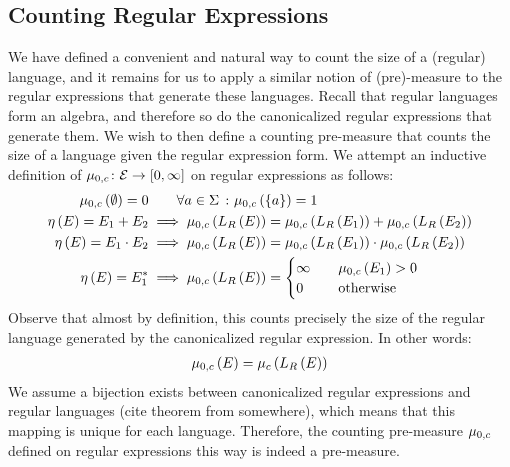 \subsection{Counting Regular Expressions}
We have defined a convenient and natural way to count the size of a
(regular) language, and it remains for us to apply a similar
notion of (pre)-measure to the regular expressions that generate
these languages.
Recall that regular languages form an algebra, and therefore so do
the canonicalized regular expressions that generate them.
We wish to then define a counting pre-measure that counts the size
of a language given the regular expression form.
We attempt an inductive definition of
\(\mu_{0, c} \colon \mathcal{E} \rightarrow \left[0, \infty\right]\)
on regular expressions as follows:
\begin{align*}
  \mu_{0, c}\left(\emptyset\right) = 0
    &\qquad \forall a \in \Sigma \ \colon \mu_{0, c}\left(\left\{a\right\}\right) = 1 \\
  \eta\left(E\right) = E_1 + E_2
    &\implies
      \mu_{0, c}\left(L_{R}\left(E\right)\right) =
        \mu_{0, c}\left(L_{R}\left(E_1\right)\right) +
        \mu_{0, c}\left(L_{R}\left(E_2\right)\right) \\
  \eta\left(E\right) = E_1 \cdot E_2
    &\implies
      \mu_{0, c}\left(L_{R}\left(E\right)\right) =
        \mu_{0, c}\left(L_{R}\left(E_1\right)\right) \cdot
        \mu_{0, c}\left(L_{R}\left(E_2\right)\right) \\
  \eta\left(E\right) = E_1 ^\ast
    &\implies
      \mu_{0, c}\left(L_{R}\left(E\right)\right)
        = \begin{cases}
            \infty & \quad \mu_{0, c}\left(E_1\right) > 0 \\
            0 & \quad \text{otherwise}
          \end{cases}
\end{align*}
Observe that almost by definition,
this counts precisely the size of the regular language generated by
the canonicalized regular expression.
In other words:
\begin{align*}
  \mu_{0, c}\left(E\right) = \mu_{c}\left(L_{R}\left(E\right)\right)
\end{align*}
We assume a bijection exists between canonicalized regular expressions
and regular languages (cite theorem from somewhere),
which means that this mapping is unique for each language.
Therefore, the counting pre-measure \(\mu_{0, c}\)
defined on regular expressions this way is indeed a pre-measure.




